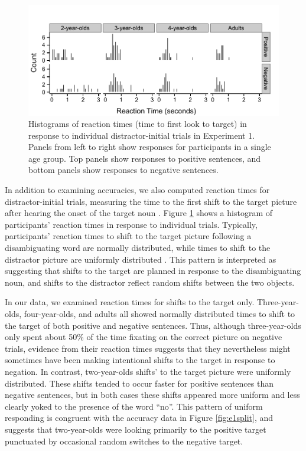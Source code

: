 \documentclass[man]{apa2}
\begin{document}
\begin{figure}
\begin{center} 
\includegraphics[width=6in]{RTs_nothing.pdf}
\caption{\label{fig:e1rt} Histograms of reaction times (time to first look to target) in response to individual distractor-initial trials in Experiment 1.  Panels from left to right show responses for participants in a single age group.  Top panels show responses to positive sentences, and bottom panels show responses to negative sentences.}
\end{center} 
\end{figure}

In addition to examining accuracies, we also computed reaction times for distractor-initial trials, measuring the time to the first shift to the target picture after hearing the onset of the target noun \cite{fernald2008}.  Figure \ref{fig:e1rt} shows a histogram of participants' reaction times in response to individual trials.  Typically, participants' reaction times to shift to the target picture following a disambiguating word are normally distributed,  while times to shift to the distractor picture are uniformly distributed \cite{fernald2008}.  This pattern is interpreted as suggesting that shifts to the target are planned in response to the disambiguating noun, and shifts to the distractor reflect random shifts between the two objects.  

In our data, we examined reaction times for shifts to the target only. Three-year-olds, four-year-olds, and adults all showed normally distributed times to shift to the target of both positive and negative sentences. Thus, although three-year-olds only spent about 50\% of the time fixating on the correct picture on negative trials, evidence from their reaction times suggests that they nevertheless might sometimes have been making intentional shifts to the target in response to negation.  In contrast, two-year-olds shifts' to the target picture were uniformly distributed.  These shifts tended to occur faster for positive sentences than negative sentences, but in both cases these shifts appeared more uniform and less clearly yoked to the presence of the word ``no''.  This pattern of uniform responding is congruent with the accuracy data in Figure \ref{fig:e1split}, and suggests that two-year-olds were looking primarily to the positive target punctuated by occasional random switches to the negative target.  
\end{document}
